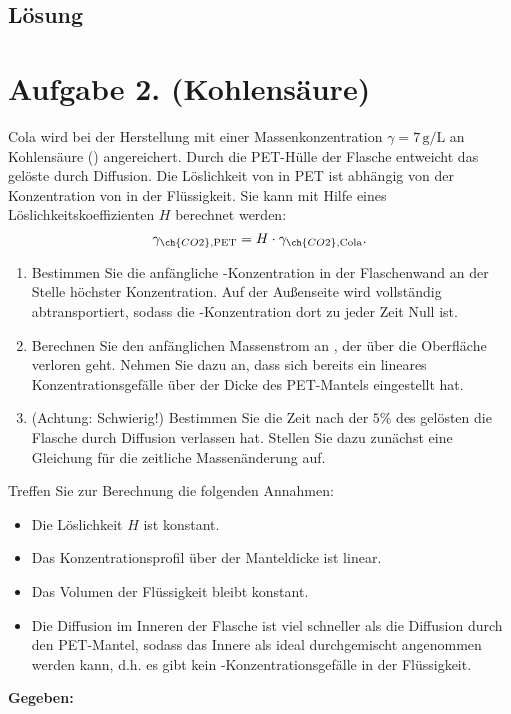 \documentclass[german,12pt]{homework}
\newcommand{\sis}[1]{\,\si{#1}}
\begin{document}
    \subsection*{Lösung}

    \section*{Aufgabe 2. (Kohlensäure)}

    \begin{problem}
        Cola wird bei der Herstellung mit einer Massenkonzentration \(\gamma = 7\sis{\gram\per\liter}\) an Kohlensäure () angereichert. Durch die PET-Hülle der Flasche entweicht das gelöste  durch Diffusion. Die Löslichkeit von  in PET ist abhängig von der Konzentration von  in der Flüssigkeit. Sie kann mit Hilfe eines Löslichkeitskoeffizienten \(H\) berechnet werden:
        \[\gamma_{\ch{CO2},\text{PET}} = H \cdot \gamma_{\ch{CO2},\text{Cola}}.\]
        \begin{enumerate}
            \item Bestimmen Sie die anfängliche -Konzentration in der Flaschenwand an der Stelle höchster Konzentration. Auf der Außenseite wird  vollständig abtransportiert, sodass die -Konzentration dort zu jeder Zeit Null ist.
            \item Berechnen Sie den anfänglichen Massenstrom an , der über die Oberfläche verloren geht. Nehmen Sie dazu an, dass sich bereits ein lineares Konzentrationsgefälle über der Dicke des PET-Mantels eingestellt hat.
            \item (Achtung: Schwierig!) Bestimmen Sie die Zeit nach der \(5\%\) des gelösten  die Flasche durch Diffusion verlassen hat. Stellen Sie dazu zunächst eine Gleichung für die zeitliche Massenänderung auf.
        \end{enumerate}
        Treffen Sie zur Berechnung die folgenden Annahmen:
        \begin{itemize}
            \item Die Löslichkeit \(H\) ist konstant.
            \item Das Konzentrationsprofil über der Manteldicke ist linear.
            \item Das Volumen der Flüssigkeit bleibt konstant.
            \item Die Diffusion im Inneren der Flasche ist viel schneller als die Diffusion durch den PET-Mantel, sodass das Innere als ideal durchgemischt angenommen werden kann, d.h. es gibt kein -Konzentrationsgefälle in der Flüssigkeit.
        \end{itemize}
        \textbf{Gegeben:}


\end{problem}
\end{document}
